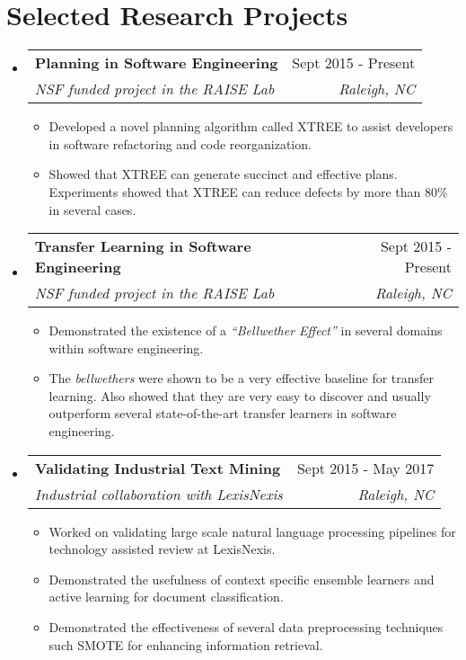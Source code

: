\documentclass[letterpaper,9pt]{article}
\makeatletter
\newcommand{\resumeSubheading}[4]{
  \vspace{-1pt}\item[]
    \begin{tabular*}{\textwidth}{l@{\extracolsep{\fill}}r}
      \textbf{#1} & #2 \\
      \textit{\small#3} & \textit{\small #4} \\
    \end{tabular*}\vspace{-5pt}
}
\newcommand{\resumeSubHeadingListStart}{\begin{itemize}[leftmargin=0pt]}
\newcommand{\resumeSubHeadingListEnd}{\end{itemize}}
\newcommand{\resumeItemListStart}{\begin{itemize}[noitemsep, leftmargin=8pt]}
\newcommand{\resumeItemListEnd}{\end{itemize}\vspace{-5pt}}
\makeatother
\begin{document}
\section{Selected Research Projects}

\resumeSubHeadingListStart

\resumeSubheading{Planning in Software Engineering}{Sept 2015 - Present}
{NSF funded project in the RAISE Lab}{Raleigh, NC}\vspace{-0.25cm}
\resumeItemListStart
	\item Developed a novel planning algorithm called XTREE to assist 
	developers in software refactoring and code reorganization.
	\item Showed that XTREE can generate succinct and effective plans. 
	Experiments showed that XTREE can reduce defects by more than 80\% in 
	several cases.\vspace{-0.1cm}
\resumeItemListEnd

\resumeSubheading{Transfer Learning in Software Engineering}{Sept 2015 - 
Present}{NSF funded project in the RAISE Lab}{Raleigh, NC}\vspace{-0.25cm}
\resumeItemListStart
	\item Demonstrated the existence of a \textit{``Bellwether Effect''} in 
	several domains within software engineering.
	\item The \textit{bellwethers} were shown to be a very effective baseline 
	for transfer learning. Also showed that they are very easy to discover and 
	usually outperform 
	several 
	state-of-the-art transfer learners in software engineering.\vspace{-0.1cm}
\resumeItemListEnd

\resumeSubheading{Validating Industrial Text Mining}{Sept 2015 - May 2017}
{Industrial collaboration with LexisNexis}{Raleigh, NC}\vspace{-0.25cm}
\resumeItemListStart
\item Worked on validating large scale natural language processing pipelines 
for technology assisted review at LexisNexis.
\item Demonstrated the usefulness of context specific ensemble learners and 
active learning for document classification.
\item Demonstrated the effectiveness of several data preprocessing techniques 
such SMOTE for enhancing information retrieval.\vspace{-0.2cm}
\resumeItemListEnd


\resumeSubHeadingListEnd
\end{document}
